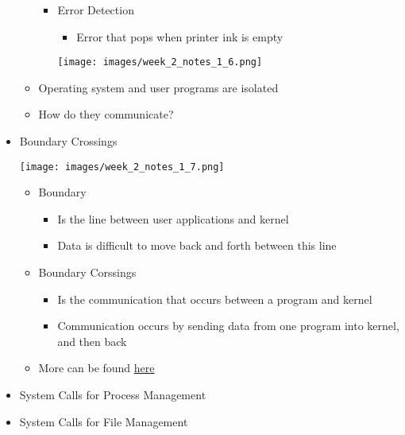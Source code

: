 \documentclass[12pt]{article}
\begin{document}
\begin{itemize}
\begin{itemize}
\begin{itemize}
            \item Error Detection
            \begin{itemize}
                \item Error that pops when printer ink is empty
            \end{itemize}

            \begin{center}
            \texttt{[image: images/week\_2\_notes\_1\_6.png]}
            \end{center}
        \end{itemize}

        \item Operating system and user programs are isolated

        \item How do they communicate?
    \end{itemize}
    \item Boundary Crossings

    \bigskip

    \begin{center}
    \texttt{[image: images/week\_2\_notes\_1\_7.png]}
    \end{center}

    \bigskip

    \begin{itemize}
        \item Boundary
        \begin{itemize}
            \item Is the line between user applications and kernel
            \item Data is difficult to move back and forth between this line
        \end{itemize}
        \item Boundary Corssings
        \begin{itemize}
            \item Is the communication that occurs between a program and kernel
            \item Communication occurs by sending data from one program into kernel,
            and then back
        \end{itemize}

        \item More can be found \href{https://docs.huihoo.com/darwin/kernel-programming-guide/boundaries/chapter_14_section_1.html}{here}
    \end{itemize}

    \item System Calls for Process Management
    \item System Calls for File Management

\end{itemize}
\end{document}
